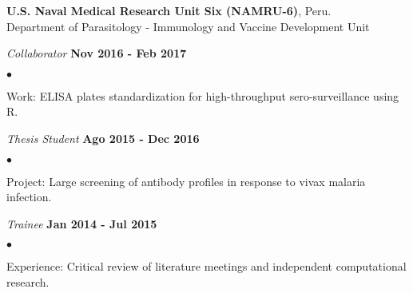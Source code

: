 \documentclass[margin,line]{res}
\newenvironment{list1}{
  \begin{list}{\ding{113}}{%
      \setlength{\itemsep}{0in}
      \setlength{\parsep}{0in} \setlength{\parskip}{0in}
      \setlength{\topsep}{0in} \setlength{\partopsep}{0in}
      \setlength{\leftmargin}{0.17in}}}{\end{list}}
\newenvironment{list2}{
  \begin{list}{$\bullet$}{%
      \setlength{\itemsep}{0in}
      \setlength{\parsep}{0in} \setlength{\parskip}{0in}
      \setlength{\topsep}{0in} \setlength{\partopsep}{0in}
      \setlength{\leftmargin}{0.2in}}}{\end{list}}
\begin{document}
\begin{resume}
{\bf U.S. Naval Medical Research Unit Six (NAMRU-6)}, Peru.\\
Department of Parasitology - Immunology and Vaccine Development Unit\\
\vspace*{-.1in}
\begin{list1}
	\item[] {\em Collaborator} \hfill {\bf Nov 2016 - Feb 2017}\\
	\vspace*{-.1in}
	\begin{list2} %
		\item Work: ELISA plates standardization for high-throughput sero-surveillance using R.\\%
	\end{list2}
	\vspace*{-.1in}
	\item[] {\em Thesis Student} \hfill {\bf Ago 2015 - Dec 2016}\\
	\vspace*{-.1in}
	\begin{list2} %
		\item Project: Large screening of antibody profiles in response to vivax malaria infection.\\
	\end{list2}
	\vspace*{-.1in}
	\item[] {\em Trainee} \hfill {\bf Jan 2014 - Jul 2015}\\
	\vspace*{-.1in}
	\begin{list2} %
		\item Experience: Critical review of literature meetings and independent computational research.

\end{list2}
\end{list1}
\end{resume}
\end{document}
